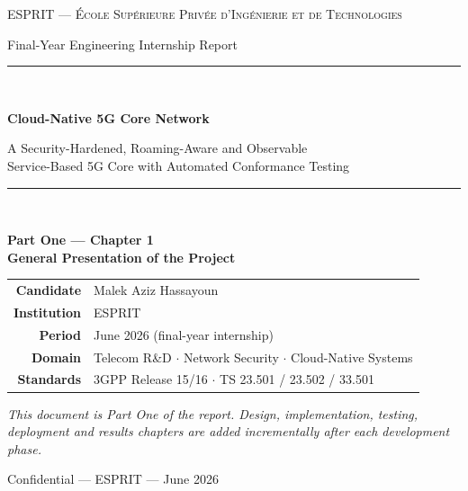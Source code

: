 \documentclass[11pt,a4paper]{report}
\begin{document}
\begin{titlepage}
  \centering
  \vspace*{0.8cm}
  {\large\scshape ESPRIT — École Supérieure Privée d'Ingénierie et de Technologies\par}
  \vspace{0.3cm}
  {\normalsize Final-Year Engineering Internship Report\par}
  \vspace{1.4cm}
  \rule{\linewidth}{0.6pt}\\[0.5cm]
  {\Huge\bfseries\color{accent} Cloud-Native 5G Core Network\par}
  \vspace{0.5cm}
  {\large A Security-Hardened, Roaming-Aware and Observable\\
   Service-Based 5G Core with Automated Conformance Testing\par}
  \rule{\linewidth}{0.6pt}\\[1.4cm]

  {\Large\bfseries Part One --- Chapter 1\\[0.2cm]
   General Presentation of the Project\par}
  \vspace{1.8cm}

  \begin{tabular}{rl}
    \toprule
    \textbf{Candidate}   & Malek Aziz Hassayoun\\
    \textbf{Institution} & ESPRIT\\
    \textbf{Period}      & June 2026 (final-year internship)\\
    \textbf{Domain}      & Telecom R\&D $\cdot$ Network Security $\cdot$ Cloud-Native Systems\\
    \textbf{Standards}   & 3GPP Release 15/16 $\cdot$ TS 23.501 / 23.502 / 33.501\\
    \bottomrule
  \end{tabular}

  \vfill
  {\small\itshape This document is Part One of the report. Design, implementation,
   testing, deployment and results chapters are added incrementally after each
   development phase.\par}
  \vspace{0.4cm}
  {\scriptsize Confidential — ESPRIT — June 2026\par}
\end{titlepage}

\tableofcontents
\listoffigures
\listoftables
\clearpage
\end{document}
